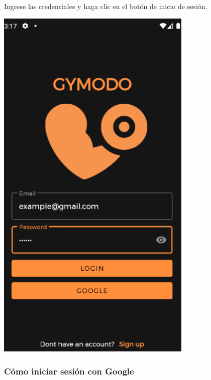 \documentclass[12pt,a4paper]{article}
\begin{document}
\begin{enumerate}
\begin{minipage}{.60\textwidth}
  \item Ingrese las credenciales y haga clic en el botón de inicio de sesión.
\end{minipage}
\begin{minipage}{.40\textwidth}
  \includegraphics[width=0.7\textwidth, right]{loginconcredenciales}
\end{minipage}
\end{enumerate}


\subsubsection{Cómo iniciar sesión con Google}
\end{document}
